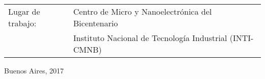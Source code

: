\begin{titlepage}
		\vspace*{3mm}
	
		\noindent\begin{tabular}{@{}ll}
		Lugar de trabajo: &Centro de Micro y Nanoelectrónica del Bicentenario \\
						  & Instituto Nacional de Tecnología Industrial (INTI-CMNB) \\ 
		\end{tabular} 
		\setlength\tabcolsep{6pt}

		\vspace*{\fill}
		\begin{center}
		\small{Buenos Aires, 2017}
	 	\end{center}


\end{titlepage}